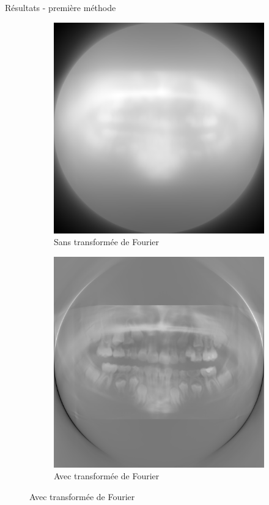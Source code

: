 \documentclass{beamer}
\begin{document}
\begin{frame}{Résultats - première méthode}
    \begin{figure}[t]
        \centering
        \begin{subfigure}[b]{0.42\textwidth}
            \includegraphics[width=\textwidth]{dentsSansFFT.png}
            \caption{Sans transformée de Fourier}
        \end{subfigure}
        \qquad \qquad 
        \pause
        \begin{subfigure}[b]{0.42\textwidth}
            \includegraphics[width=\textwidth]{dentsAvecFFT.png}
            \caption{Avec transformée de Fourier}
        \end{subfigure}
    \end{figure}
\end{frame}
\end{document}
